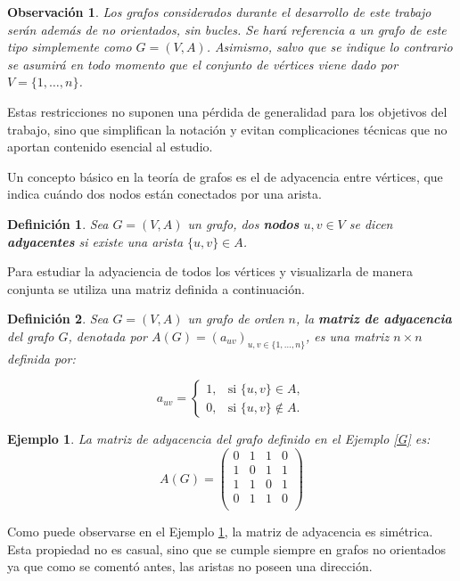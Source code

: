 \documentclass[11pt,a4paper,spanish]{report}
\theoremstyle{plain}
\newtheorem{definicion}{Definición}[chapter]
\newtheorem{nota}{Observación}
\newtheorem{ejemplo}{Ejemplo}[chapter]
\begin{document}
\begin{nota}
Los grafos considerados durante el desarrollo de este trabajo serán además de no orientados, sin bucles. Se hará referencia a un grafo de este tipo simplemente como $G = (V, A)$. Asimismo, salvo que se indique lo contrario se asumirá en todo momento que el conjunto de vértices viene dado por $V=\{1,\dots,n\}$.
\end{nota}

Estas restricciones no suponen una pérdida de generalidad para los objetivos del
trabajo, sino que simplifican la notación y evitan complicaciones técnicas que no
aportan contenido esencial al estudio. 

Un concepto básico en la teoría de grafos es el de adyacencia entre vértices, que indica cuándo dos nodos están conectados por una arista.




\begin{definicion}\cite{gross2018graph}
Sea $G=(V,A)$ un grafo, dos \textbf{nodos} $u,v \in V$ se dicen \textbf{adyacentes} si existe una arista \(\{u, v\} \in A\). %
\end{definicion}
Para estudiar la adyaciencia de todos los vértices y visualizarla de manera conjunta se utiliza una matriz definida a continuación.
\begin{definicion}\cite{gross2018graph}
Sea $G=(V,A)$ un grafo de orden $n$, la \textbf{matriz de adyacencia} del grafo $G$, denotada por \(A(G) = (a_{uv})_{u,v \in \{1, \dots, n\}}\), es una matriz \(n \times n\) definida por:

\[
a_{uv} =
\begin{cases} 
1, & \text{si } \{u,v\} \in A, \\
0, & \text{si } \{u,v\} \notin A.
\end{cases}
\]
\end{definicion}

\begin{ejemplo}\label{ej:matriz adya}
 La matriz de adyacencia del grafo definido en el Ejemplo \ref{G} es: \[
A(G)=\begin{pmatrix}
 0 & 1 & 1 & 0 \\
 1 & 0 & 1 & 1 \\
 1 & 1 & 0 & 1 \\
 0 & 1 & 1 & 0 \\
\end{pmatrix}
\]
\end{ejemplo}

Como puede observarse en el Ejemplo \ref{ej:matriz adya}, la matriz de adyacencia es simétrica. Esta propiedad no es casual, sino que se cumple siempre en grafos no orientados ya que como se comentó antes, las aristas no poseen una dirección. 
\end{document}
